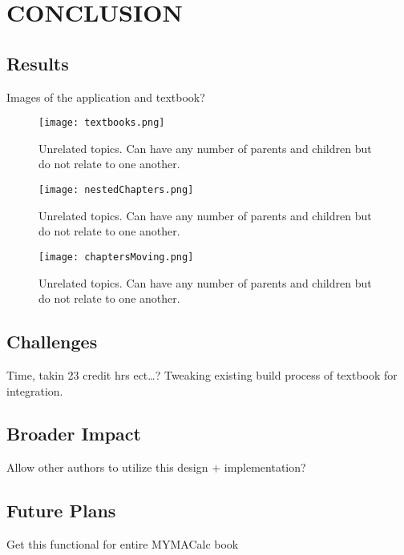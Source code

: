 %
%
%
%

\chapter{CONCLUSION}

\section{Results}

Images of the application and textbook?

\begin{figure}[ht]
    \centering
    \texttt{[image: textbooks.png]}
    \caption[Unrelated topics.]{Unrelated topics. Can have any number of parents and children but do not relate to one another.}
        
    \label{fig:textbooks}
\end{figure}

\begin{figure}[ht]
    \centering
    \texttt{[image: nestedChapters.png]}
    \caption[Unrelated topics.]{Unrelated topics. Can have any number of parents and children but do not relate to one another.}
        
    \label{fig:nestedChapters}
\end{figure}

\begin{figure}[ht]
    \centering
    \texttt{[image: chaptersMoving.png]}
    \caption[Unrelated topics.]{Unrelated topics. Can have any number of parents and children but do not relate to one another.}
        
    \label{fig:chaptersMoving}
\end{figure}

\section{Challenges}

Time, takin 23 credit hrs ect\dots?
Tweaking existing build process of textbook for integration.

\section{Broader Impact}

Allow other authors to utilize this design + implementation?

\section{Future Plans}

Get this functional for entire MYMACalc book
